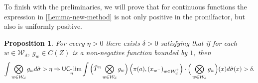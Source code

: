 \documentclass[letter,11pt]{article}
\newtheorem{prop}[theo]{Proposition}
\theoremstyle{definition}
\newcommand{\uclim}{\mathop{\textup{\textsf{UC-}}\lim}}
\begin{document}
To finish with the preliminaries, we will prove that for continuous functions the expression in \cref{Lemma-new-method} is not only positive in the pronilfactor, but also is uniformly positive. 


\begin{prop}\label{Theo-in-pronil}
    For every $\eta>0$ there exists $\delta>0$ satisfying that if for each $w\in \mathcal{W}_d$, $g_w\in C(Z)$ is a non-negative function bounded by $1$, then
    \begin{equation*}
        \int \bigotimes_{w\in \mathcal{W}_d}g_w d\tilde{\sigma}>\eta \Rightarrow   \uclim_{n}\int      \Big( \tilde{T}^n \bigotimes_{w\in \mathcal{W}_d} g_{w}\Big)\left(\pi(a), (x_{w^-})_{w\in \mathcal{W}_{d}^{+}} \right)\cdot \Big(\bigotimes_{w\in \mathcal{W}_d}g_{w}  \Big)(x)  d\tilde{\sigma}(x)    >\delta.
    \end{equation*}
\end{prop}
\end{document}
